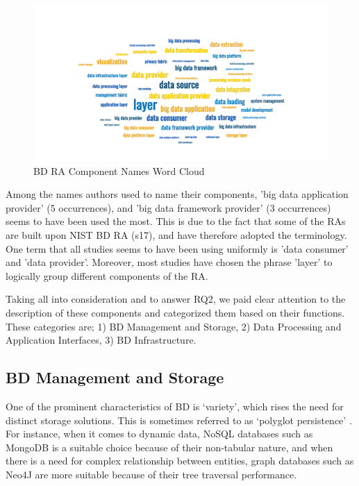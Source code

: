 \documentclass{ieeeaccess}
\begin{document}
\begin{figure}[h]
    \includegraphics[width=18cm]{wordcloud.png}
    \caption{BD RA Component Names Word Cloud}
    \label{image:word-cloud}
\end{figure}

Among the names authors used to name their components, 'big data application provider' (5 occurrences), and 'big data framework provider' (3 occurrences) seems to have been used the most. This is due to the fact that some of the RAs are built upon NIST BD RA (s17), and have therefore adopted the terminology. One term that all studies seems to have been using uniformly is 'data consumer' and 'data provider'. Moreover, most studies have chosen the phrase 'layer' to logically group different components of the RA.

Taking all into consideration and to answer RQ2, we paid clear attention to the description of these components and categorized them based on their functions. These categories are; 1) BD Management and Storage, 2) Data Processing and Application Interfaces, 3) BD Infrastructure.

\subsection{BD Management and Storage}

One of the prominent characteristics of BD is ‘variety’, which rises the need for distinct storage solutions. This is sometimes referred to as ‘polyglot persistence’ \cite{khine2019review}. For instance, when it comes to dynamic data, NoSQL databases such as MongoDB is a suitable choice because of their non-tabular nature, and when there is a need for complex relationship between entities, graph databases such as Neo4J are more suitable because of their tree traversal performance. 
 
\end{document}
